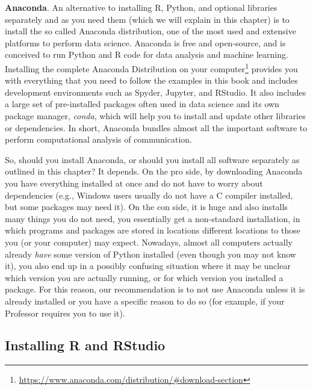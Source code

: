 \begin{feature}\textbf{Anaconda}. An alternative to installing 
  R, Python, and optional libraries separately and as you need them
  (which we will explain in this chapter) is to install the so called
  Anaconda distribution, one of the most used and extensive platforms
  to perform data science. Anaconda is free and open-source, and is
  conceived to run Python and R code for data analysis and machine
  learning. Installing the complete Anaconda Distribution on your
  computer\footnote{\url{https://www.anaconda.com/distribution/\#download-section}}
  provides you with everything that you need to follow the examples in
  this book and includes development environments such as Spyder,
  Jupyter, and RStudio. It also includes a large set of pre-installed
  packages often used in data science and its own package manager,
  \emph{conda}, which will help you to install and update other
  libraries or dependencies. In short, Anaconda bundles  almost all the 
  important software to perform computational analysis of
  communication.

  So, should you install Anaconda, or should you
  install all software separately as outlined in this chapter? It
  depends. On the pro side, by downloading Anaconda you have everything installed at once and do
  not have to worry about dependencies (e.g., Windows users usually
  do not have a C compiler installed, but some packages may need
  it). On the con side,  it is huge and also installs many
  things you do not need, you essentially get a non-standard
  installation, in which programs and packages are stored in locations different
  locations to those you (or your computer) may expect. Nowadays, almost all computers
  actually already \emph{have} some version of Python installed (even though you may
  not know it), you also end up in a possibly confusing situation
  where it may be unclear which version you are actually running, or
  for which version you installed a package.
  For this reason, our recommendation is to not use Anaconda unless
  it is already installed or you have a specific reason to do so
  (for example, if your Professor requires you to use it).
\end{feature}

\subsection{Installing R and RStudio}

